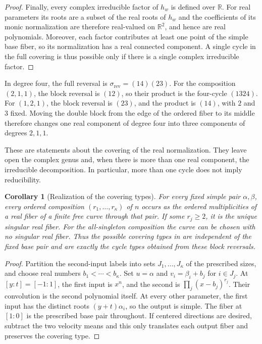 \documentclass[12pt,reqno]{amsart}
\newtheorem{corollary}[corollary]{Corollary}
\theoremstyle{definition}
\theoremstyle{remark}
\newcommand{\R}{\mathbb R}
\begin{document}
\begin{proof}
Finally, every complex irreducible factor of \(h_w\) is defined over
\(\R\).  For real parameters its roots are a subset of the real
roots of \(h_w\) and the coefficients of its monic normalization are
therefore real-valued on \(\R^2\), and hence are real polynomials.
Moreover, each factor contributes at least one point of the simple base
fiber, so its normalization has a real connected component.  A single
cycle in the full covering is thus possible only if there is a single
complex irreducible factor.
\end{proof}

In degree four, the full reversal is \(\sigma_{\mathrm{rev}}=(14)(23)\). For the composition \((2,1,1)\), the block reversal is \((12)\), so their product is the four-cycle \((1324)\). For \((1,2,1)\), the block reversal is \((23)\), and the product is \((14)\), with \(2\) and \(3\) fixed. Moving the double block from the edge of the ordered fiber to its middle therefore changes one real component of degree four into three components of degrees \(2,1,1\).

These are statements about the covering of the real normalization.
They leave open the complex genus and, when there is more than one real
component, the irreducible decomposition.  In particular, more than one
cycle does not imply reducibility.

\begin{corollary}[Realization of the covering types]
\label{cor:collision-composition-realization}
For every fixed simple pair \(\alpha,\beta\), every ordered
composition \((r_1,\ldots,r_{\kappa})\) of \(n\) occurs as the ordered
multiplicities of a real fiber of a finite free curve through that pair.
If some \(r_j\geq2\), it is the unique singular real fiber. For the
all-singleton composition the curve can be chosen with no singular real
fiber.  Thus the possible covering types in
 are independent of the fixed base pair and
are exactly the cycle types obtained from these block reversals.
\end{corollary}

\begin{proof}
Partition the second-input labels into sets \(J_1,\ldots,J_{\kappa}\) of
the prescribed sizes, and choose real numbers \(b_1<\cdots<b_{\kappa}\).
Set \(u=\alpha\) and \(v_i=\beta_i+b_j\) for \(i\in J_j\).
At \([y:t]=[-1:1]\), the first input is \(x^n\), and the second
is \(\prod_j(x-b_j)^{r_j}\).  Their convolution is the second
polynomial itself.  At every other parameter, the first input has the
distinct roots \((y+t)\alpha_i\), so the output is simple.  The
fiber at \([1:0]\) is the prescribed base pair throughout.
If centered directions are desired, subtract the two velocity means and this only translates each output fiber and preserves the covering type.
\end{proof}
\end{document}
